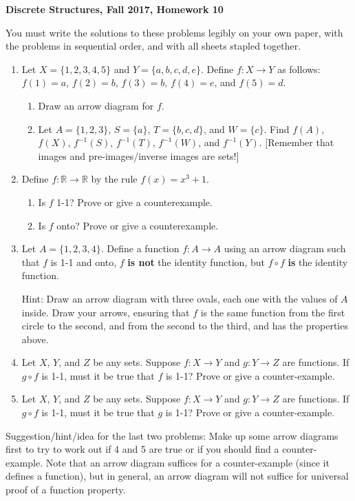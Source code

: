 \documentclass[11pt, letterpaper]{report}
\newcommand{\R}{\mathbb{R}}
\begin{document}
\textbf{Discrete Structures, Fall 2017, Homework 10}

\bigskip

You must write the solutions to these problems legibly on your own paper, with
the problems in sequential order, and with all sheets stapled together.

\begin{enumerate}

\item Let $X = \{1,2,3,4,5\}$ and  $Y=\{a,b,c,d,e\}$.  Define $f:X\to Y$ as follows: $f(1)=a$, $f(2)=b$, 
$f(3)=b$, $f(4)=e$, and $f(5)=d$.
\begin{enumerate}
        \item Draw an arrow diagram for $f$.
        \item Let $A= \{1,2,3\}$, $S=\{a\}$, $T=\{b,c,d\}$, and $W=\{c\}$.  Find $f(A)$, $f(X)$, $f^{-1}(S)$, $f^{-1}(T)$, $f^{-1}(W)$, and $f^{-1}(Y)$.  [Remember that images and pre-images/inverse images are sets!]
\end{enumerate}

\item Define $f : \R \to \R$ by the rule $f(x) = x^3+1$.  
\begin{enumerate}
\item Is $f$ 1-1?  Prove or give a counterexample.

\item Is $f$ onto?  Prove or give a counterexample. 
\end{enumerate}



\item Let $A = \{1, 2, 3, 4\}$.  Define a function $f:A \to A$ using an arrow diagram such that
$f$ is 1-1 and onto, $f$ \textbf{is not} the identity function, but $f \circ f$ \textbf{is} the identity function.

Hint: Draw an arrow diagram with three ovals, each one with the values of $A$ inside.  Draw your arrows,
ensuring that $f$ is the same function from the first circle to the second, and from the second to the third, and
has the properties above.

\item Let $X$, $Y$, and $Z$ be any sets.  Suppose $f:X\to Y$ and $g: Y \to Z$ are functions.
If $g \circ f$ is 1-1, must it be true that $f$ is 1-1?  Prove or give a counter-example.

\item Let $X$, $Y$, and $Z$ be any sets.  Suppose $f:X\to Y$ and $g: Y \to Z$ are functions.
If $g \circ f$ is 1-1, must it be true that $g$ is 1-1?  Prove or give a counter-example.

\end{enumerate}
Suggestion/hint/idea for the last two problems: Make up some arrow diagrams first to try to work out if 
4 and 5 are true or if you should find a counter-example.  Note that an arrow diagram suffices
for a counter-example (since it defines a function), but in general, an arrow diagram will
not suffice for universal proof of a function property.
\end{document}
